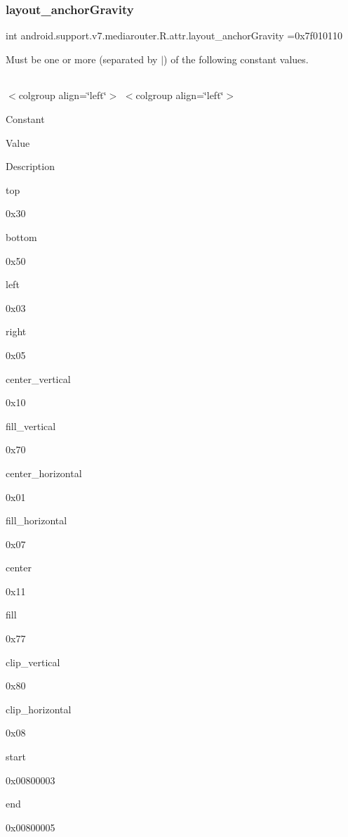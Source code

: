 \subsubsection{\texorpdfstring{layout\+\_\+anchor\+Gravity}{layout\_anchorGravity}}
{\footnotesize\ttfamily int android.\+support.\+v7.\+mediarouter.\+R.\+attr.\+layout\+\_\+anchor\+Gravity =0x7f010110\hspace{0.3cm}{\ttfamily [static]}}

Must be one or more (separated by \textquotesingle{}$\vert$\textquotesingle{}) of the following constant values.

\tabulinesep=1mm
\begin{longtabu} spread 0pt [c]{*{0}{|X[-1]}|}
\hline
\end{longtabu}
$<$colgroup align=\char`\"{}left\char`\"{}$>$ $<$colgroup align=\char`\"{}left\char`\"{}$>$ 

Constant

Value

Description 

{\ttfamily top}

0x30

{\ttfamily bottom}

0x50

{\ttfamily left}

0x03

{\ttfamily right}

0x05

{\ttfamily center\+\_\+vertical}

0x10

{\ttfamily fill\+\_\+vertical}

0x70

{\ttfamily center\+\_\+horizontal}

0x01

{\ttfamily fill\+\_\+horizontal}

0x07

{\ttfamily center}

0x11

{\ttfamily fill}

0x77

{\ttfamily clip\+\_\+vertical}

0x80

{\ttfamily clip\+\_\+horizontal}

0x08

{\ttfamily start}

0x00800003

{\ttfamily end}

0x00800005\mbox{\label{classandroid_1_1support_1_1v7_1_1mediarouter_1_1R_1_1attr_af01a26bb13f9e082ad8d1eec85df0fde}} 
